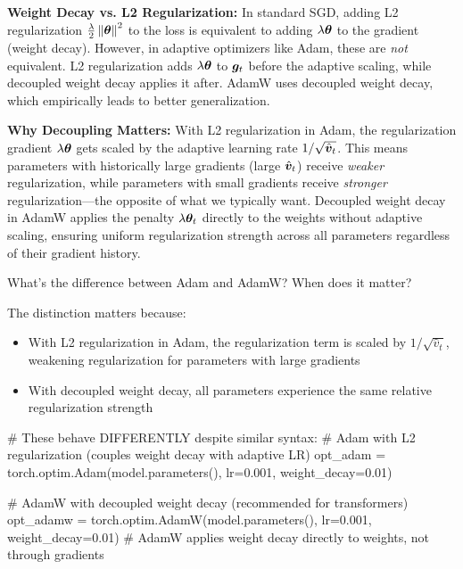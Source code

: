 \documentclass[../../main.tex]{subfiles}
\begin{document}
\begin{important}
\textbf{Weight Decay vs. L2 Regularization:} In standard SGD, adding L2 regularization $\frac{\lambda}{2}\left\lVert \boldsymbol{\theta} \right\rVert^2$ to the loss is equivalent to adding $\lambda \boldsymbol{\theta}$ to the gradient (weight decay). However, in adaptive optimizers like Adam, these are \textit{not} equivalent. L2 regularization adds $\lambda \boldsymbol{\theta}$ to $\boldsymbol{g}_t$ before the adaptive scaling, while decoupled weight decay applies it after. AdamW uses decoupled weight decay, which empirically leads to better generalization.

\textbf{Why Decoupling Matters:} With L2 regularization in Adam, the regularization gradient $\lambda \boldsymbol{\theta}$ gets scaled by the adaptive learning rate $1/\sqrt{\hat{\boldsymbol{v}}_t}$. This means parameters with historically large gradients (large $\hat{\boldsymbol{v}}_t$) receive \emph{weaker} regularization, while parameters with small gradients receive \emph{stronger} regularization---the opposite of what we typically want. Decoupled weight decay in AdamW applies the penalty $\lambda \boldsymbol{\theta}_t$ directly to the weights without adaptive scaling, ensuring uniform regularization strength across all parameters regardless of their gradient history.
\end{important}

\begin{checkpoint}
What's the difference between Adam and AdamW? When does it matter?
\end{checkpoint}

The distinction matters because:
\begin{itemize}
    \item With L2 regularization in Adam, the regularization term is scaled by $1/\sqrt{\hat{v}_t}$, weakening regularization for parameters with large gradients
    \item With decoupled weight decay, all parameters experience the same relative regularization strength
\end{itemize}

\begin{pythoncode}
# These behave DIFFERENTLY despite similar syntax:
# Adam with L2 regularization (couples weight decay with adaptive LR)
opt_adam = torch.optim.Adam(model.parameters(), lr=0.001, weight_decay=0.01)

# AdamW with decoupled weight decay (recommended for transformers)
opt_adamw = torch.optim.AdamW(model.parameters(), lr=0.001, weight_decay=0.01)
# AdamW applies weight decay directly to weights, not through gradients
\end{pythoncode}
\end{document}
